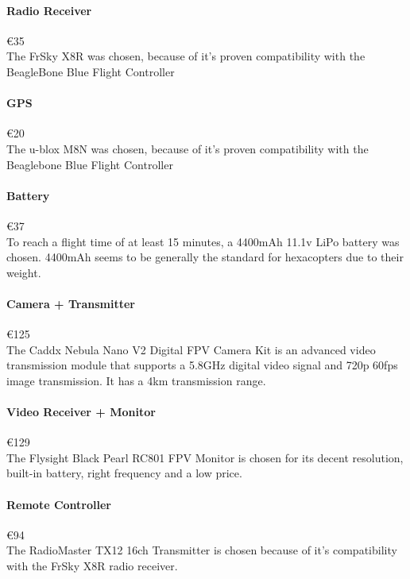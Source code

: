 \paragraph{Radio Receiver}\mbox{€35} \\
The FrSky X8R was chosen, because of it's proven compatibility with the BeagleBone Blue Flight Controller \cite{ardupilotblue}

\paragraph{GPS}\mbox{€20} \\
The u-blox M8N was chosen, because of it's proven compatibility with the Beaglebone Blue Flight Controller \cite{ardupilotblue}

\paragraph{Battery}\mbox{€37} \\
To reach a flight time of at least 15 minutes, a 4400mAh 11.1v LiPo battery was chosen. \cite{jmtbattery} 4400mAh seems to be generally the standard for hexacopters due to their weight.

\paragraph{Camera + Transmitter}\mbox{€125} \\
The Caddx Nebula Nano V2 Digital FPV Camera Kit \cite{vidtransmit} is an advanced video transmission module that supports a 5.8GHz digital video signal and 720p 60fps image transmission. It has a 4km transmission range.

\paragraph{Video Receiver + Monitor}\mbox{€129} \\
The Flysight Black Pearl RC801 FPV Monitor is chosen for its decent resolution, built-in battery, right frequency and a low price. \cite{fpvmonitor}

\paragraph{Remote Controller}\mbox{€94} \\
The RadioMaster TX12 16ch Transmitter is chosen because of it's compatibility with the FrSky X8R radio receiver. \cite{remotecontroller}
\newpage
